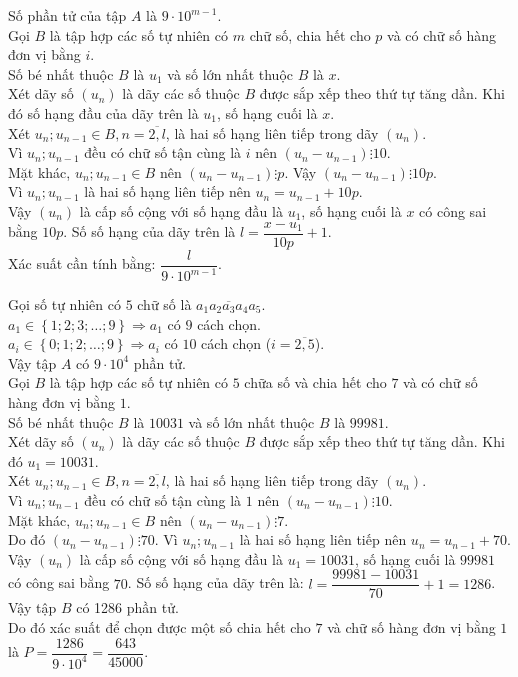 \begin{vd}
{\begin{tongquat}
			Số phần tử của tập $A$ là $9\cdot10^{m-1}$.\\
			Gọi $B$ là tập hợp các số tự nhiên có $m$ chữ số,  chia hết cho $p$ và có chữ số hàng đơn vị bằng $i$.\\
			Số bé nhất thuộc $B$ là $u_1$ và số lớn nhất thuộc $B$ là $x$.\\Xét dãy số $\left(u_n \right) $ là dãy các số thuộc $B$ được sắp xếp theo thứ tự tăng dần. Khi đó số hạng đầu của dãy trên là $u_1$, số hạng cuối là $x$.\\
			Xét $u_n; u_{n-1} \in B, n=\overline{2,l}$, là hai số hạng liên tiếp trong dãy $\left(u_n \right) $.\\ Vì $u_n; u_{n-1}$ đều có chữ số tận cùng là $i$ nên $(u_n-u_{n-1}) \vdots 10$.\\ Mặt khác, $u_n; u_{n-1} \in B$ nên $(u_n-u_{n-1}) \vdots p$. Vậy $(u_n-u_{n-1}) \vdots 10p$.\\ Vì  $u_n; u_{n-1}$ là hai số hạng liên tiếp nên $u_n=u_{n-1}+10p$. \\Vậy  $\left(u_n \right) $ là cấp số cộng với số hạng đầu là $u_1$, số hạng cuối là $x$ có công sai bằng $10p$. Số số hạng của dãy trên là $l=\dfrac{x-u_1}{10p}+1$. \\Xác suất cần tính bằng:  $\dfrac{l}{9\cdot10^{m-1}}$.
		\end{tongquat}
		\noindent
		Gọi số tự nhiên có $5$ chữ số là $\overline{a_1a_2a_3a_4a_5}$.\\
		$a_1 \in \left\lbrace 1;2;3;\ldots;9\right\rbrace \Rightarrow a_1$ có $9$ cách chọn.\\
		$a_i\in \left\lbrace 0;1;2;\ldots;9\right\rbrace  \Rightarrow a_i$ có $10$ cách chọn ($i=\overline{2,5}$).\\ Vậy tập $A$ có $9\cdot 10^4$ phần tử.\\ Gọi $B$ là tập hợp các số tự nhiên có $5$ chữa số và chia hết cho $7$ và có chữ số hàng đơn vị bằng $1$.\\ Số bé nhất thuộc $B$ là $10031$ và số lớn nhất thuộc $B$ là $99981$.\\ Xét dãy số $\left(u_n \right) $ là dãy các số thuộc $B$ được sắp xếp theo thứ tự tăng dần. Khi đó $u_1=10031$.\\
		Xét $u_n; u_{n-1} \in B, n=\overline{2,l}$, là hai số hạng liên tiếp trong dãy $\left(u_n \right) $.\\ Vì $u_n; u_{n-1}$ đều có chữ số tận cùng là $1$ nên $(u_n-u_{n-1}) \vdots 10$. \\Mặt khác, $u_n; u_{n-1} \in B$ nên $(u_n-u_{n-1}) \vdots 7$. \\Do đó $(u_n-u_{n-1}) \vdots 70$. Vì  $u_n; u_{n-1}$ là hai số hạng liên tiếp nên $u_n=u_{n-1}+70$.\\ Vậy  $\left(u_n \right) $ là cấp số cộng với số hạng đầu là $u_1=10031$, số hạng cuối là $99981$ có công sai bằng $70$. Số số hạng của dãy trên là: $l=\dfrac{99981-10031}{70}+1=1286$.\\ 
		Vậy tập $B$ có 1286 phần tử. \\Do đó xác suất để chọn được một số chia hết cho $7 $ và chữ số hàng đơn vị bằng $1$ là $P=\dfrac{1286}{9\cdot10^4}=\dfrac{643}{45000}$.}
\end{vd}

